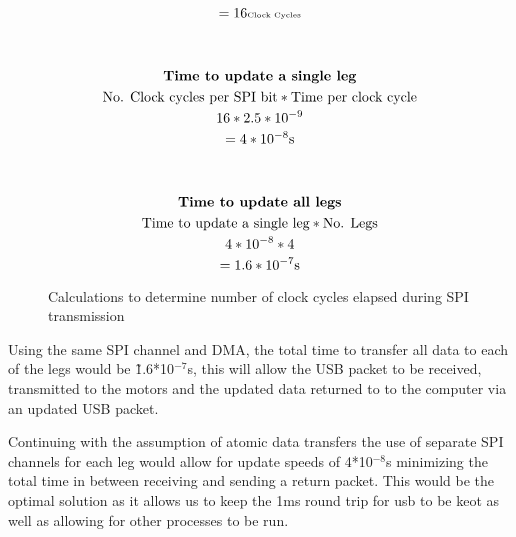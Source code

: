 \begin{figure}[!t]
\begin{minipage}{0.5\textwidth}
\begin{gather*}
                        =16\tiny{\text{Clock Cycles}}\\
                        \\
                        \\
                        \textbf{Time to update a single leg}\\
                        \text{No. Clock cycles per SPI bit} * \text{Time per clock cycle}\\
                        16 * 2.5*10^{-9}\\
                        =4*10^{-8}\text{s}\\
                        \\
                        \\
                        \textbf{Time to update all legs}\\
                        \text{Time to update a single leg} * \text{No. Legs}\\
                        4*10^{-8}* 4\\
                        =1.6*10^{-7}\text{s}\\
                    \end{gather*}  
                \end{minipage}
                \caption{Calculations to determine number of clock cycles elapsed during SPI transmission}
                \label{fig:SPIClockCycles}
                \end{figure}

                Using the same SPI channel and DMA, the total time to transfer all data to each of the legs would be \~ 1.6*10$^{-7}$s, this will allow the USB packet to be received, transmitted to the motors and the updated data returned to to the computer via an updated USB packet. \newline
            
            Continuing with the assumption of atomic data transfers the use of separate SPI channels for each leg would allow for update speeds of 4*10$^{-8}$s minimizing the total time in between receiving and sending a return packet. This would be the optimal solution as it allows us to keep the 1ms round trip for usb to be keot as well as allowing for other processes to be run.  
            
